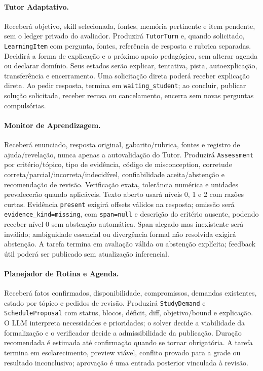 \documentclass[12pt]{article}
\newcommand{\code}[1]{\nolinkurl{#1}}
\begin{document}
\paragraph{Tutor Adaptativo.}
Receberá objetivo, skill selecionada, fontes, memória pertinente e item pendente, sem o ledger privado do avaliador. Produzirá \code{TutorTurn} e, quando solicitado, \code{LearningItem} com pergunta, fontes, referência de resposta e rubrica separadas. Decidirá a forma de explicação e o próximo apoio pedagógico, sem alterar agenda ou declarar domínio. Seus estados serão explicar, tentativa, pista, autoexplicação, transferência e encerramento. Uma solicitação direta poderá receber explicação direta. Ao pedir resposta, termina em \code{waiting_student}; ao concluir, publicar solução solicitada, receber recusa ou cancelamento, encerra sem novas perguntas compulsórias.

\paragraph{Monitor de Aprendizagem.}
Receberá enunciado, resposta original, gabarito/rubrica, fontes e registro de ajuda/revelação, nunca apenas a autovalidação do Tutor. Produzirá \code{Assessment} por critério/tópico, tipo de evidência, código de misconception, corretude correta/parcial/incorreta/indecidível, confiabilidade aceita/abstenção e recomendação de revisão. Verificação exata, tolerância numérica e unidades prevalecerão quando aplicáveis. Texto aberto usará níveis 0, 1 e 2 com razões curtas. Evidência \code{present} exigirá offsets válidos na resposta; omissão será \code{evidence_kind=missing}, com \code{span=null} e descrição do critério ausente, podendo receber nível 0 sem abstenção automática. Span alegado mas inexistente será inválido; ambiguidade essencial ou divergência formal não resolvida exigirá abstenção. A tarefa termina em avaliação válida ou abstenção explícita; feedback útil poderá ser publicado sem atualização inferencial.

\paragraph{Planejador de Rotina e Agenda.}
Receberá fatos confirmados, disponibilidade, compromissos, demandas existentes, estado por tópico e pedidos de revisão. Produzirá \code{StudyDemand} e \code{ScheduleProposal} com status, blocos, déficit, diff, objetivo/bound e explicação. O LLM interpreta necessidades e prioridades; o solver decide a viabilidade da formalização e o verificador decide a admissibilidade da publicação. Duração recomendada é estimada até confirmação quando se tornar obrigatória. A tarefa termina em esclarecimento, preview viável, conflito provado para a grade ou resultado inconclusivo; aprovação é uma entrada posterior vinculada à revisão.
\end{document}

